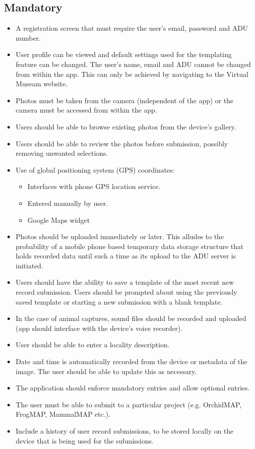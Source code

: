 \documentclass[12pt,a4paper,oneside]{report}
\begin{document}
	\subsection{Mandatory}
		\begin{itemize}
			\item A registration screen that must require the user's email, password and ADU number.
			\item User profile can be viewed and default settings used for the templating feature can be changed. The user's name, email and ADU cannot be changed from within the app. This can only be achieved by navigating to the Virtual Museam website.
			\item Photos must be taken from the camera (independent of the app) or the camera must be accessed from within the app.
			\item Users should be able to browse existing photos from the device's gallery.
			\item Users should be able to review the photos before submission, possibly removing unwanted selections.
			\item Use of global positioning system (GPS) coordinates:
				\begin{itemize}
					\item Interfaces with phone GPS location service.
					\item Entered manually by user.
					\item Google Maps widget
				\end{itemize}
			\item Photos should be uploaded immediately or later. This alludes to the probability of a mobile phone based temporary data storage structure that holds recorded data until such a time as its upload to the ADU server is initiated.
			\item Users should have the ability to save a template of the most recent new record submission.  Users should be prompted about using the previously saved template or starting a new submission with a blank template.
			\item In the case of animal captures, sound files should be recorded and uploaded (app should interface with the device's voice recorder).
			\item User should be able to enter a locality description.
			\item Date and time is automatically recorded from the device or metadata of the image. The user should be able to update this as necessary.
			\item The application should enforce mandatory entries and allow optional entries.
			\item The user must be able to submit to a particular project (e.g. OrchidMAP, FrogMAP, MammalMAP etc.).
			\item Include a history of user record submissions, to be stored locally on the device that is being used for the submissions.
		\end{itemize}
\end{document}
